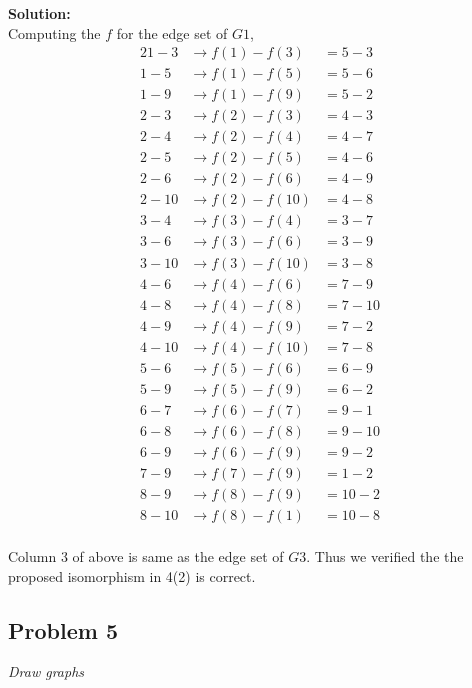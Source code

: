 \documentclass[12pt,a4paper]{article}
\newcommand{\solution}{\noindent\textbf{Solution:}\\}
\begin{document}
\solution
Computing the $f$ for the edge set of $G1$,
\begin{alignat*}{2}
    1 - 3  &\rightarrow f(1) - f(3)  &= 5 - 3  \\
    1 - 5  &\rightarrow f(1) - f(5)  &= 5 - 6  \\
    1 - 9  &\rightarrow f(1) - f(9)  &= 5 - 2  \\
    2 - 3  &\rightarrow f(2) - f(3)  &= 4 - 3  \\
    2 - 4  &\rightarrow f(2) - f(4)  &= 4 - 7  \\
    2 - 5  &\rightarrow f(2) - f(5)  &= 4 - 6  \\
    2 - 6  &\rightarrow f(2) - f(6)  &= 4 - 9  \\
    2 - 10 &\rightarrow f(2) - f(10) &= 4 - 8  \\
    3 - 4  &\rightarrow f(3) - f(4)  &= 3 - 7  \\
    3 - 6  &\rightarrow f(3) - f(6)  &= 3 - 9  \\
    3 - 10 &\rightarrow f(3) - f(10) &= 3 - 8  \\
    4 - 6  &\rightarrow f(4) - f(6)  &= 7 - 9  \\
    4 - 8  &\rightarrow f(4) - f(8)  &= 7 - 10 \\ 
    4 - 9  &\rightarrow f(4) - f(9)  &= 7 - 2  \\
    4 - 10 &\rightarrow f(4) - f(10) &= 7 - 8  \\
    5 - 6  &\rightarrow f(5) - f(6)  &= 6 - 9  \\
    5 - 9  &\rightarrow f(5) - f(9)  &= 6 - 2  \\
    6 - 7  &\rightarrow f(6) - f(7)  &= 9 - 1  \\
    6 - 8  &\rightarrow f(6) - f(8)  &= 9 - 10 \\ 
    6 - 9  &\rightarrow f(6) - f(9)  &= 9 - 2  \\
    7 - 9  &\rightarrow f(7) - f(9)  &= 1 - 2  \\
    8 - 9  &\rightarrow f(8) - f(9)  &= 10 - 2 \\ 
    8 - 10 &\rightarrow f(8) - f(1)  &= 10 - 8 \\
\end{alignat*}

Column 3 of above is same as the edge set of $G3$. Thus we verified the the proposed isomorphism in 4(2) is correct.

\newpage
\subsection*{Problem 5}
\textit{
    Draw graphs
}
\end{document}
